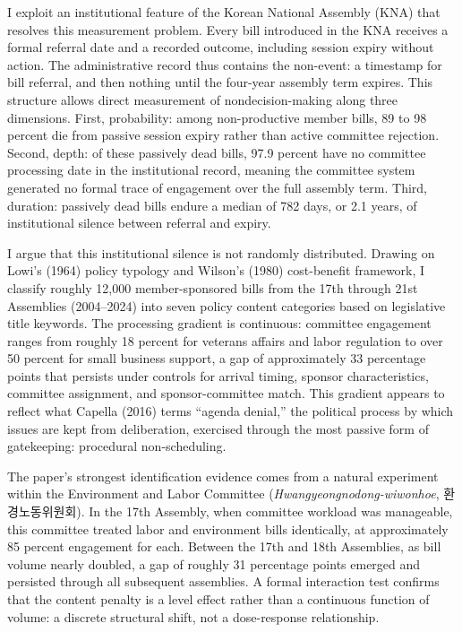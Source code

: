 \documentclass[11pt]{article}
\begin{document}
I exploit an institutional feature of the Korean National Assembly (KNA) that resolves this measurement problem. Every bill introduced in the KNA receives a formal referral date and a recorded outcome, including session expiry without action. The administrative record thus contains the non-event: a timestamp for bill referral, and then nothing until the four-year assembly term expires. This structure allows direct measurement of nondecision-making along three dimensions. First, probability: among non-productive member bills, 89 to 98 percent die from passive session expiry rather than active committee rejection. Second, depth: of these passively dead bills, 97.9 percent have no committee processing date in the institutional record, meaning the committee system generated no formal trace of engagement over the full assembly term. Third, duration: passively dead bills endure a median of 782 days, or 2.1 years, of institutional silence between referral and expiry.

I argue that this institutional silence is not randomly distributed. Drawing on Lowi's (1964) policy typology and Wilson's (1980) cost-benefit framework, I classify roughly 12,000 member-sponsored bills from the 17th through 21st Assemblies (2004--2024) into seven policy content categories based on legislative title keywords. The processing gradient is continuous: committee engagement ranges from roughly 18 percent for veterans affairs and labor regulation to over 50 percent for small business support, a gap of approximately 33 percentage points that persists under controls for arrival timing, sponsor characteristics, committee assignment, and sponsor-committee match. This gradient appears to reflect what Capella (2016) terms ``agenda denial,'' the political process by which issues are kept from deliberation, exercised through the most passive form of gatekeeping: procedural non-scheduling.

The paper's strongest identification evidence comes from a natural experiment within the Environment and Labor Committee (\textit{Hwangyeongnodong-wiwonhoe}, 환경노동위원회). In the 17th Assembly, when committee workload was manageable, this committee treated labor and environment bills identically, at approximately 85 percent engagement for each. Between the 17th and 18th Assemblies, as bill volume nearly doubled, a gap of roughly 31 percentage points emerged and persisted through all subsequent assemblies. A formal interaction test confirms that the content penalty is a level effect rather than a continuous function of volume: a discrete structural shift, not a dose-response relationship.
\end{document}
